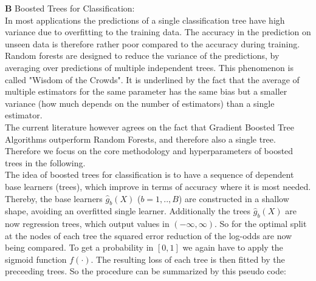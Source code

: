 \documentclass[12pt,titlepage]{article}
\begin{document}
\textbf{B} Boosted Trees for Classification: \\

In most applications the predictions of a single classification tree have high variance due to overfitting to the training data. The accuracy in the prediction on unseen data is therefore rather poor compared to the accuracy during training. Random forests \cite{randomforest} are designed to reduce the variance of the predictions, by averaging over predictions of multiple independent trees. This phenomenon is called "Wisdom of the Crowds". It is underlined by the fact that the average of multiple estimators for the same parameter has the same bias but a smaller variance (how much depends on the number of estimators) than a single estimator. \\
The current literature however agrees on the fact that Gradient Boosted Tree Algorithms outperform Random Forests, and therefore also a single tree. Therefore we focus on the core methodology and hyperparameters of boosted trees in the following. \\
The idea of boosted trees for classification is to have a sequence of dependent base learners (trees), which improve in terms of accuracy where it is most needed. Thereby, the base learners $\hat{g}_{b}(X)$ ($b=1,..,B$) are constructed in a shallow shape, avoiding an overfitted single learner. Additionally the trees $\hat{g}_{b}(X)$ are now regression trees, which output values in $(-\infty, \infty)$. So for the optimal split at the nodes of each tree the squared error reduction of the log-odds are now being compared. To get a probability in $[0, 1]$ we again have to apply the sigmoid function $f(\cdot)$. The resulting loss of each tree is then fitted by the preceeding trees. So the procedure can be summarized by this pseudo code: \\
\end{document}
